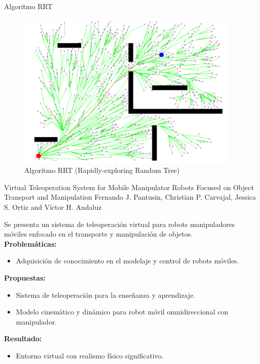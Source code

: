 \documentclass[10pt,aspectratio=169]{beamer}
\begin{document}
\begin{frame}{Algoritmo RRT}
  \begin{figure}
    \begin{center}
      \includegraphics[width=0.95\textwidth]{figures/rrt.png}
    \end{center}
    \caption{Algoritmo RRT (Rapidly-exploring Random Tree)}\label{fig:rrt}
  \end{figure}
\end{frame}

\begin{frame}{Virtual Teleoperation System for Mobile Manipulator Robots Focused on Object Transport and Manipulation \scriptsize{Fernando J. Pantusin, Christian P. Carvajal, Jessica S. Ortiz and Víctor H. Andaluz}}

  Se presenta un sistema de teleoperación virtual para robots manipuladores móviles enfocado en el transporte y manipulación de objetos.\\[5pt]

  \textbf{Problemáticas:}
  \begin{itemize}
    \item Adquisición de conocimiento en el modelaje y control de robots móviles.
  \end{itemize}

  \textbf{Propuestas:}
  \begin{itemize}
    \item Sistema de teleoperación para la enseñanza y aprendizaje.
    \item Modelo cinemático y dinámico para robot móvil omnidireccional con manipulador.
  \end{itemize}

  \textbf{Resultado:}
  \begin{itemize}
    \item Entorno virtual con realismo físico significativo.
  \end{itemize}
\end{frame}
\end{document}
